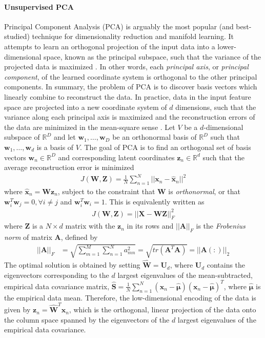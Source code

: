 \paragraph{Unsupervised PCA}
Principal Component Analysis (PCA) is arguably the most popular (and best-studied) technique for dimensionality reduction and manifold learning.  It attempts to learn an orthogonal projection of the input data into a lower-dimensional space, known as the principal subspace, such that the variance of the projected data is maximized \citep{Chao2019RecentAdvancesSupervisedDimRed}.  In other words, each \textit{principal axis}, or \textit{principal component}, of the learned coordinate system is orthogonal to the other principal components.  In summary, the problem of PCA is to discover basis vectors which linearly combine to reconstruct the data.  In practice, data in the input feature space are projected into a new coordinate system of $d$ dimensions, such that the variance along each principal axis is maximized and the reconstruction errors of the data are minimized in the mean-square sense \citep{Thorstensen2009ManifoldThesis}.  Let $V$ be a $d$-dimensional subspace of $\mathbb{R}^{D}$ and let  $\bm{w}_1, \dots, \bm{w}_D$ be an orthonormal basis of $\mathbb{R}^{D}$ such that $\bm{w}_1, \dots, \bm{w}_d$ is a basis of $V$.  The goal of PCA is to find an orthogonal set of basis vectors $\bm{w}_n \in \mathbb{R}^{D}$ and corresponding latent coordinates $\bm{z}_n \in \mathbb{R}^{d}$ such that the average reconstruction error is minimized \citep{Murphy2012}
\begin{align}
	J(\bm{W}, \bm{Z}) = \frac{1}{N}\sum_{n=1}^{N} ||\bm{x}_n - \hat{\bm{x}}_n ||^{2}
\end{align}
\noindent
where $\hat{\bm{x}}_n = \bm{W}\bm{z}_{n}$, subject to the constraint that $\bm{W}$ is \textit{orthonormal}, or that $\bm{w}_{i}^{T}\bm{w}_{j}=0,\forall i \neq j$ and $\bm{w}_{i}^{T}\bm{w}_{i}=1 $.  This is equivalently written as 
\begin{align}
		J(\bm{W}, \bm{Z}) = ||\bm{X} - \bm{W}\bm{Z} ||^{2}_{F}
\end{align}
\noindent
where $\bm{Z}$ is a $N \times d$ matrix with the $\bm{z}_{n}$ in its rows and $||\bm{A}||_{F}$ is the \textit{Frobenius norm} of matrix $\bm{A}$, defined by 
\begin{align}
	||\bm{A}||_{F} &= \sqrt{\sum_{m=1}^{M}\sum_{n=1}^{N}a^{2}_{mn}} = \sqrt{tr(\bm{A}^{T}\bm{A})} = ||\bm{A}(:)||_{2}
\end{align} 
\noindent
The optimal solution is obtained by setting $\hat{\bm{W}} = \bm{U}_{d}$, where $\bm{U}_{d}$ contains the eigenvectors corresponding to the $d$ largest eigenvalues of the mean-subtracted, empirical data covariance matrix, $\hat{\bm{S}} = \frac{1}{N}\sum_{n=1}^{N}(\bm{x}_{n}-\hat{\bm{\mu}})(\bm{x}_{n}-\hat{\bm{\mu}})^{T}$, where $\hat{\bm{\mu}}$ is the empirical data mean.  Therefore, the low-dimensional encoding of the data is given by $\bm{z}_n = \hat{\bm{W}}^{T}\bm{x}_n$, which is the orthogonal, linear projection of the data onto the column space spanned by the eigenvectors of the $d$ largest eigenvalues of the empirical data covariance.  


